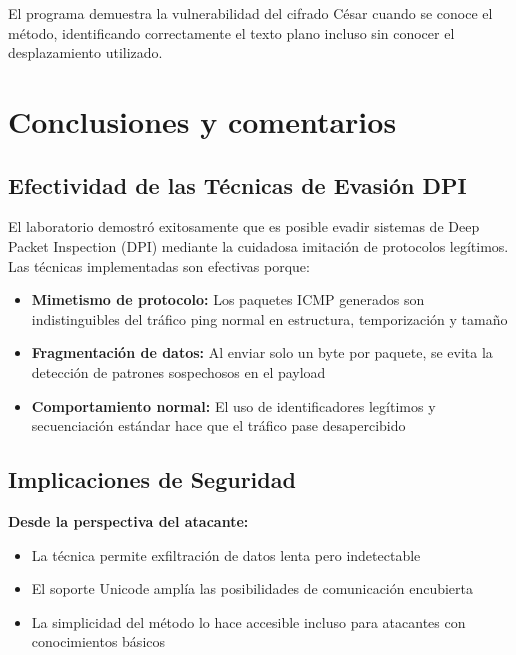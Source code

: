 \documentclass[letter,12pt]{article}
\begin{document}
El programa demuestra la vulnerabilidad del cifrado César cuando se conoce el método, identificando correctamente el texto plano incluso sin conocer el desplazamiento utilizado.



\section*{Conclusiones y comentarios}

\subsection*{Efectividad de las Técnicas de Evasión DPI}

El laboratorio demostró exitosamente que es posible evadir sistemas de Deep Packet Inspection (DPI) mediante la cuidadosa imitación de protocolos legítimos. Las técnicas implementadas son efectivas porque:

\begin{itemize}
    \item \textbf{Mimetismo de protocolo:} Los paquetes ICMP generados son indistinguibles del tráfico ping normal en estructura, temporización y tamaño
    \item \textbf{Fragmentación de datos:} Al enviar solo un byte por paquete, se evita la detección de patrones sospechosos en el payload
    \item \textbf{Comportamiento normal:} El uso de identificadores legítimos y secuenciación estándar hace que el tráfico pase desapercibido
\end{itemize}

\subsection*{Implicaciones de Seguridad}

\textbf{Desde la perspectiva del atacante:}
\begin{itemize}
    \item La técnica permite exfiltración de datos lenta pero indetectable
    \item El soporte Unicode amplía las posibilidades de comunicación encubierta
    \item La simplicidad del método lo hace accesible incluso para atacantes con conocimientos básicos
\end{itemize}
\end{document}
